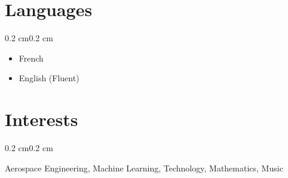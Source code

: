 \documentclass[10pt, letterpaper]{article}
\newenvironment{highlights}{%
    \begin{itemize}[
        topsep=0.10 cm,%
        parsep=0.10 cm,%
        partopsep=0pt,%
        itemsep=0pt,%
        leftmargin=0.4 cm + 10pt%
    ]
}{%
    \end{itemize}%
}
\newenvironment{onecolentry}{%
    \begin{adjustwidth}{0.2 cm}{0.2 cm}%
}{%
    \end{adjustwidth}%
}
\begin{document}
\section{Languages}
\begin{onecolentry}
    \begin{highlights}
        \item French  
        \item English (Fluent)  
    \end{highlights}
\end{onecolentry}

\section{Interests}
\begin{onecolentry}
    Aerospace Engineering, Machine Learning, Technology, Mathematics, Music
\end{onecolentry}
\end{document}
